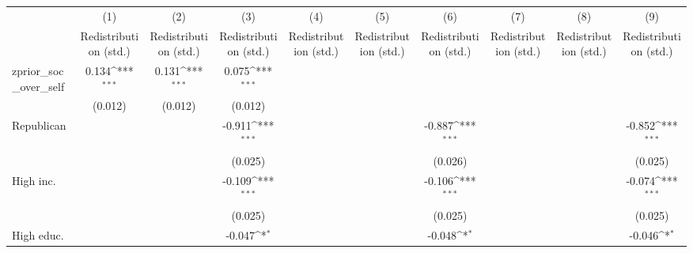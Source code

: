 {
\def\sym#1{\ifmmode^{#1}\else\(^{#1}\)\fi}
\begin{tabular}{l*{9}{c}}
\toprule
                    &\multicolumn{1}{c}{(1)}&\multicolumn{1}{c}{(2)}&\multicolumn{1}{c}{(3)}&\multicolumn{1}{c}{(4)}&\multicolumn{1}{c}{(5)}&\multicolumn{1}{c}{(6)}&\multicolumn{1}{c}{(7)}&\multicolumn{1}{c}{(8)}&\multicolumn{1}{c}{(9)}\\
                    &\multicolumn{1}{c}{Redistribution (std.)}&\multicolumn{1}{c}{Redistribution (std.)}&\multicolumn{1}{c}{Redistribution (std.)}&\multicolumn{1}{c}{Redistribution (std.)}&\multicolumn{1}{c}{Redistribution (std.)}&\multicolumn{1}{c}{Redistribution (std.)}&\multicolumn{1}{c}{Redistribution (std.)}&\multicolumn{1}{c}{Redistribution (std.)}&\multicolumn{1}{c}{Redistribution (std.)}\\
\midrule
zprior\_soc\_over\_self&       0.134\sym{***}&       0.131\sym{***}&       0.075\sym{***}&                     &                     &                     &                     &                     &                     \\
                    &     (0.012)         &     (0.012)         &     (0.012)         &                     &                     &                     &                     &                     &                     \\
\addlinespace
Republican          &                     &                     &      -0.911\sym{***}&                     &                     &      -0.887\sym{***}&                     &                     &      -0.852\sym{***}\\
                    &                     &                     &     (0.025)         &                     &                     &     (0.026)         &                     &                     &     (0.025)         \\
\addlinespace
High inc.           &                     &                     &      -0.109\sym{***}&                     &                     &      -0.106\sym{***}&                     &                     &      -0.074\sym{***}\\
                    &                     &                     &     (0.025)         &                     &                     &     (0.025)         &                     &                     &     (0.025)         \\
\addlinespace
High educ.          &                     &                     &      -0.047\sym{*}  &                     &                     &      -0.048\sym{*}  &                     &                     &      -0.046\sym{*}  \\

\end{tabular}}
